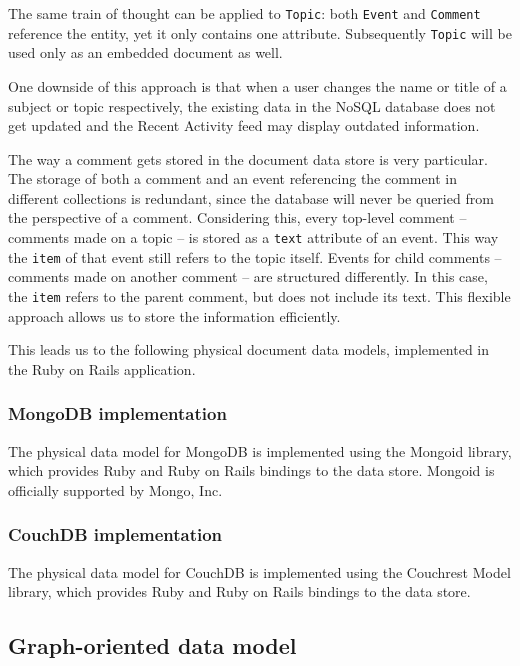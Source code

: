The same train of thought can be applied to \texttt{Topic}: both \texttt{Event} and \texttt{Comment} reference the entity, yet it only contains one attribute.
Subsequently \texttt{Topic} will be used only as an embedded document as well.

One  downside of this approach is that when a user changes the name or title of a subject or topic respectively, the existing data in the NoSQL database does not get updated and the Recent Activity feed may display outdated information.

The way a comment gets stored in the document data store is very particular.
The storage of both a comment and an event referencing the comment in different collections is redundant, since the database will never be queried from the perspective of a comment.
Considering this, every top-level comment -- comments made on a topic -- is stored as a \texttt{text} attribute of an event.
This way the \texttt{item} of that event still refers to the topic itself.
Events for child comments -- comments made on another comment -- are structured differently.
In this case, the \texttt{item} refers to the parent comment, but does not include its text.
This flexible approach allows us to store the information efficiently.

This leads us to the following physical document data models, implemented in the Ruby on Rails application.

\subsubsection{MongoDB implementation}
\label{subsubsec:mongodb-implementation}

The physical data model for MongoDB is implemented using the Mongoid library, which provides Ruby and Ruby on Rails bindings to the data store.
Mongoid is officially supported by Mongo, Inc.

\subsubsection{CouchDB implementation}
\label{subsubsec:couchdb-implementation}

The physical data model for CouchDB is implemented using the Couchrest Model library, which provides Ruby and Ruby on Rails bindings to the data store.

\subsection{Graph-oriented data model}
\label{subsec:graph-data-model}

